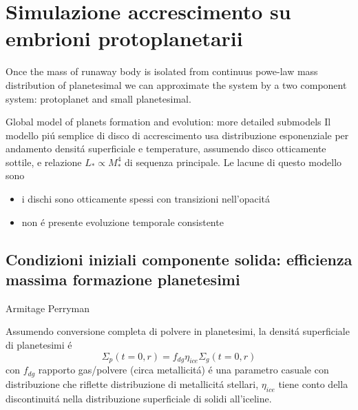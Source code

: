 {\let\clearpage\relax\let\cleardoublepage\relax
	\chapter{Simulazione accrescimento su embrioni protoplanetarii}
}

\begin{workout}
Once the mass of runaway body is isolated from continuus powe-law mass distribution of planetesimal we can approximate the system by a two component system: protoplanet and small planetesimal.
\end{workout}

\begin{workout}
	Global model of planets formation and evolution: more detailed submodels
	Il modello pi\'u semplice di disco di accrescimento usa distribuzione esponenziale per andamento densit\'a superficiale e temperature, assumendo disco otticamente sottile, e relazione $L_*\propto M_*^4$ di sequenza principale. Le lacune di questo modello sono
	\begin{itemize}
		\item i dischi sono otticamente spessi con transizioni nell'opacit\'a
		\item non \'e presente evoluzione temporale consistente
	\end{itemize}
\end{workout}

\section{Condizioni iniziali componente solida: efficienza massima formazione planetesimi}

\begin{workout}
Armitage
Perryman
\end{workout}

Assumendo conversione completa di polvere in planetesimi, la densit\'a superficiale di planetesimi \'e
\begin{equation}
\Sigma_p(t=0,r)=f_{dg}\eta_{ice}\Sigma_g(t=0,r)
\end{equation}
con $f_{dg}$ rapporto gas/polvere (circa metallicit\'a) \'e una parametro casuale con distribuzione che riflette distribuzione di metallicit\'a stellari, $\eta_{ice}$ tiene conto della discontinuit\'a nella distribuzione superficiale di solidi all'iceline.

